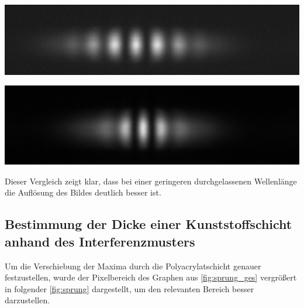 \documentclass[11pt,ngerman]{scrartcl}
\begin{document}
\begin{center}
	\begin{minipage}[t]{\textwidth}
		\includegraphics[width=\textwidth]{Interfero/Versuch2/langpassfilter_m}
		\label{fig:langpassfilter_m}
	\end{minipage}
\end{center}

\begin{center}
	\begin{minipage}[t]{\textwidth}
		\includegraphics[width=\textwidth]{Interfero/Versuch2/ohnefilter_m}
		\label{fig:ohnefilter_m}
	\end{minipage}
\end{center}

\noindent Dieser Vergleich zeigt klar, dass bei einer geringeren durchgelassenen Wellenlänge die Auflösung des Bildes deutlich besser ist.


\subsection{Bestimmung der Dicke einer Kunststoffschicht anhand des Interferenzmusters}

Um die Verschiebung der Maxima durch die Polyacrylatschicht genauer
festzustellen, wurde der Pixelbereich des Graphen aus \autoref{fig:sprung_ges}
vergrößert in folgender \autoref{fig:sprung} dargestellt, um den relevanten
Bereich besser darzustellen.
\end{document}
